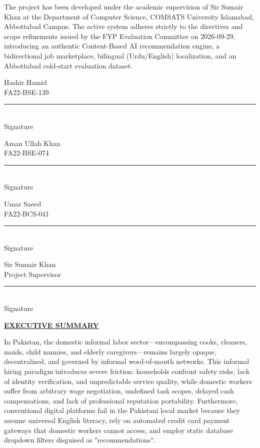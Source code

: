 \documentclass[12pt,a4paper]{article}
\begin{document}
The project has been developed under the academic supervision of Sir Sumair Khan at the Department of Computer Science, COMSATS University Islamabad, Abbottabad Campus. The active system adheres strictly to the directives and scope refinements issued by the FYP Evaluation Committee on 2026-09-29, introducing an authentic Content-Based AI recommendation engine, a bidirectional job marketplace, bilingual (Urdu/English) localization, and an Abbottabad cold-start evaluation dataset.

\vspace{28pt}
\noindent
\begin{minipage}[t]{0.31\textwidth}
\centering
Hashir Hamid\\
FA22-BSE-139\\[24pt]
\rule{0.92\linewidth}{0.4pt}\\
Signature
\end{minipage}\hfill
\begin{minipage}[t]{0.31\textwidth}
\centering
Aman Ullah Khan\\
FA22-BSE-074\\[24pt]
\rule{0.92\linewidth}{0.4pt}\\
Signature
\end{minipage}\hfill
\begin{minipage}[t]{0.31\textwidth}
\centering
Umar Saeed\\
FA22-BCS-041\\[24pt]
\rule{0.92\linewidth}{0.4pt}\\
Signature
\end{minipage}

\vspace{34pt}
\begin{center}
Sir Sumair Khan\\
Project Supervisor\\[24pt]
\rule{0.32\linewidth}{0.4pt}\\
Signature
\end{center}
\clearpage
{\centering\bfseries\underline{EXECUTIVE SUMMARY}\par}
\vspace{8pt}
In Pakistan, the domestic informal labor sector—encompassing cooks, cleaners, maids, child nannies, and elderly caregivers—remains largely opaque, decentralized, and governed by informal word-of-mouth networks. This informal hiring paradigm introduces severe friction: households confront safety risks, lack of identity verification, and unpredictable service quality, while domestic workers suffer from arbitrary wage negotiation, undefined task scopes, delayed cash compensations, and lack of professional reputation portability. Furthermore, conventional digital platforms fail in the Pakistani local market because they assume universal English literacy, rely on automated credit card payment gateways that domestic workers cannot access, and employ static database dropdown filters disguised as "recommendations".
\end{document}
